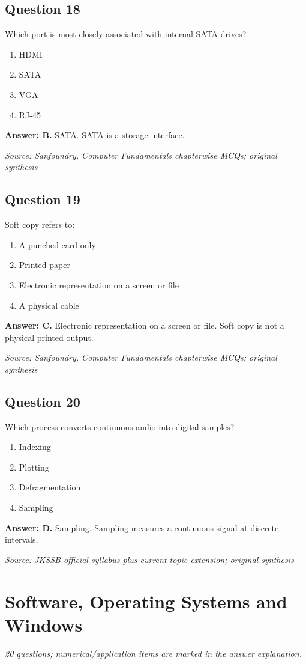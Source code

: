 \documentclass[11pt,a4paper]{book}
\newcommand{\source}[1]{\par\smallskip\textit{Source: #1}}
\newcommand{\answer}[2]{\par\textbf{Answer: #1.} #2}
\begin{document}
\section*{Question 18}
Which port is most closely associated with internal SATA drives?
\begin{enumerate}[label=\Alph*.]
\item HDMI
\item SATA
\item VGA
\item RJ-45
\end{enumerate}
\answer{B}{SATA. SATA is a storage interface.}
\source{Sanfoundry, Computer Fundamentals chapterwise MCQs; original synthesis}
\section*{Question 19}
Soft copy refers to:
\begin{enumerate}[label=\Alph*.]
\item A punched card only
\item Printed paper
\item Electronic representation on a screen or file
\item A physical cable
\end{enumerate}
\answer{C}{Electronic representation on a screen or file. Soft copy is not a physical printed output.}
\source{Sanfoundry, Computer Fundamentals chapterwise MCQs; original synthesis}
\section*{Question 20}
Which process converts continuous audio into digital samples?
\begin{enumerate}[label=\Alph*.]
\item Indexing
\item Plotting
\item Defragmentation
\item Sampling
\end{enumerate}
\answer{D}{Sampling. Sampling measures a continuous signal at discrete intervals.}
\source{JKSSB official syllabus plus current-topic extension; original synthesis}

\chapter{Software, Operating Systems and Windows}
\textit{20 questions; numerical/application items are marked in the answer explanation.}
\end{document}
